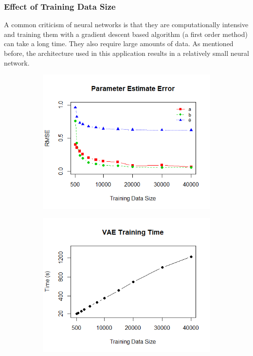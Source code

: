 \subsubsection{Effect of Training Data Size}\label{sec:data_size}
A common criticism of neural networks is that they are computationally intensive and training them with a gradient descent based algorithm (a first order method) can take a long time. They also require large amounts of data. As mentioned before, the architecture used in this application results in a relatively small neural network.

\begin{figure}[h]
\centering
    \begin{subfigure}{.47\textwidth}
      \centering
      \includegraphics[width=\linewidth]{img/ml_journal_results/vae_full_train_size_error.png}
    \end{subfigure}
    \begin{subfigure}{.47\textwidth}
      \centering
      \includegraphics[width=\linewidth]{img/ml_journal_results/vae_full_train_size_time.png}

\end{subfigure}
\end{figure}

